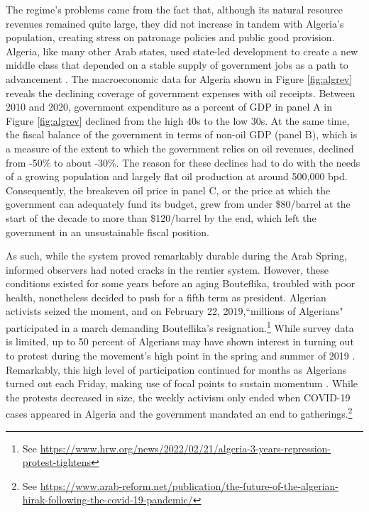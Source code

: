\documentclass[12pt, letterpaper]{article}
\begin{document}
The regime's problems came from the fact that, although its natural resource revenues remained quite large, they did not increase in tandem with Algeria's population, creating stress on patronage policies and public good provision. Algeria, like many other Arab states, used state-led development to create a new middle class that depended on a stable supply of government jobs as a path to advancement \parencite{diwan_understanding_2013}. The macroeconomic data for Algeria shown in Figure \ref{fig:algrev} reveals the declining coverage of government expenses with oil receipts. Between 2010 and 2020, government expenditure as a percent of GDP in panel A in Figure \ref{fig:algrev} declined from the high 40s to the low 30s. At the same time, the fiscal balance of the government in terms of non-oil GDP (panel B), which is a measure of the extent to which the government relies on oil revenues, declined from -50\% to about -30\%. The reason for these declines had to do with the needs of a growing population and largely flat oil production at around 500,000 bpd. Consequently, the breakeven oil price in panel C, or the price at which the government can adequately fund its budget, grew from under \$80/barrel at the start of the decade to more than \$120/barrel by the end, which left the government in an unsustainable fiscal position. 

As such, while the system proved remarkably durable during the Arab Spring, informed observers had noted cracks in the rentier system.  However, these conditions existed for some years before an aging Bouteflika, troubled with poor health, nonetheless decided to push for a fifth term as president. Algerian activists seized the moment, and on February 22, 2019,``millions of Algerians" participated in a march demanding Bouteflika's resignation.\footnote{See \url{https://www.hrw.org/news/2022/02/21/algeria-3-years-repression-protest-tightens}} While survey data is limited, up to 50 percent of Algerians may have shown interest in turning out to protest during the movement's high point in the spring and summer of 2019 \parencite{grewal_algerias_2019}. Remarkably, this high level of participation continued for months as Algerians turned out each Friday, making use of focal points to sustain momentum \parencite{ketchley_trends_2020}. While the protests decreased in size, the weekly activism only ended when COVID-19 cases appeared in Algeria and the government mandated an end to gatherings.\footnote{See \url{https://www.arab-reform.net/publication/the-future-of-the-algerian-hirak-following-the-covid-19-pandemic/}} 
\end{document}
